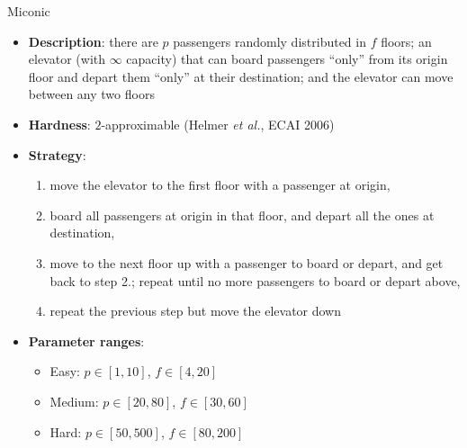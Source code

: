 \documentclass[aspectratio=169,xcolor=dvipsnames]{beamer}
\begin{document}
\begin{frame}{Miconic}

    \begin{itemize}
        \item \textbf{Description}: there are $p$ passengers randomly distributed in $f$ floors; an elevator (with $\infty$ capacity) that can board passengers ``only'' from its origin floor and depart them ``only'' at their destination; and the elevator can move between any two floors
        \item \textbf{Hardness}: $2$-approximable (Helmer \textit{et al.}, ECAI 2006)
        \item \textbf{Strategy}:
        \begin{enumerate}
            \item move the elevator to the first floor with a passenger at origin,
            \item board all passengers at origin in that floor, and depart all the ones at destination,
            \item move to the next floor up with a passenger to board or depart, and get back to step 2.; repeat until no more passengers to board or depart above,
            \item repeat the previous step but move the elevator down
        \end{enumerate}
        \item \textbf{Parameter ranges}:
        \begin{itemize}
            \item Easy: $p\in[1, 10]$, $f \in [4, 20]$
            \item Medium: $p\in[20, 80]$, $f \in [30, 60]$
            \item Hard: $p\in[50, 500]$, $f \in [80, 200]$
        \end{itemize}
    \end{itemize}

\end{frame}
\end{document}
